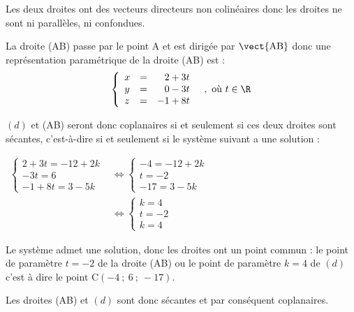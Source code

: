 Les deux droites ont des vecteurs directeurs non colinéaires  donc les droites ne sont ni parallèles, ni confondues.

La droite (AB) passe par le point A et  est dirigée par $\vect{\mathrm{AB}}$ donc une représentation paramétrique de la droite (AB) est :
\[\left\{\begin{array}{lcl}
x&=&\phantom{-}2 +3t\\
y&=&\phantom{-}0 -3 t\\
z&=&-1+8t
\end{array} \quad, \text { où } t \in \R\right.\]

$(d)$ et (AB) seront donc coplanaires si et seulement si ces deux droites sont sécantes, c'est-à-dire si et seulement si le système suivant a une solution :

$\begin{aligned}
	\left\{\begin{array}{l}
		2+3t=-12+2k\\
		-3t=6 \\
		-1+8t=3-5k
	\end{array}\right.
	&\iff
	\left\{\begin{array}{l}
		-4=-12+2k \\
		t=-2\\
		-17=3-5k
	\end{array}\right.\\
	&\iff
	\left\{\begin{array}{l}
		k=4 \\
		t=-2\\
		k=4
	\end{array}\right.
\end{aligned}$

Le système admet une solution, donc les droites ont un point commun : le point de paramètre $t=-2$ de la droite (AB) ou le point de paramètre $k=4$ de $(d)$ c'est à dire le point C$(-4~;~6~;~-17)$.

Les droites (AB) et $(d)$  sont donc sécantes et par conséquent coplanaires.

\bigskip

